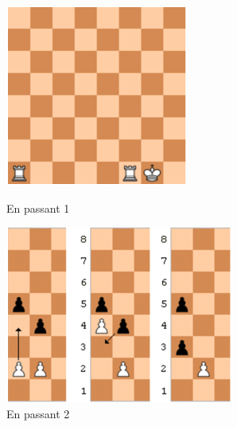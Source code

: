 \documentclass{article}
\begin{document}
\begin{figure}[!htb]
%
    \includegraphics[width=\linewidth]{chess8}
    \caption{En passant 1}\label{fig:chess9}
\endminipage\hfill
{}%
    \includegraphics[width=\linewidth]{chess10}
    \caption{En passant 2}\label{fig:chess10}
\endminipage
\end{figure}
\end{document}
